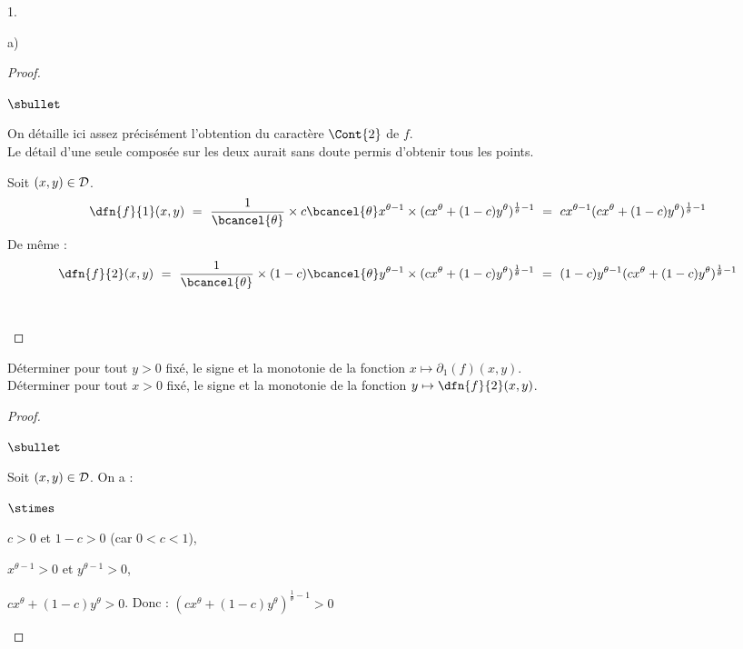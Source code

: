 \begin{noliste}{1.}
\begin{noliste}{a)}
\begin{proof}
\begin{noliste}{$\sbullet$}
    \begin{remark}
     On détaille ici assez précisément l'obtention du 
     caractère $\Cont{2}$ de $f$.\\
     Le détail d'une seule composée sur les deux 
     aurait sans doute permis d'obtenir tous les points.
    \end{remark}
    
    \item Soit $(x,y) \in {\cal D}$.
    \[
     \dfn{f}{1}(x,y) \ = \ \dfrac{1}{\bcancel{\theta}}
     \times c \bcancel{\theta} x^{\theta -1} \times 
     (c x^\theta + (1-c) y^\theta)^{\frac{1}{\theta} -1}
     \ = \ c x^{\theta-1} (c x^\theta + (1-c) 
     y^\theta)^{\frac{1}{\theta} -1}
    \]
    De même :
    \[
     \dfn{f}{2}(x,y) \ = \ \dfrac{1}{\bcancel{\theta}}
     \times (1-c) \bcancel{\theta} y^{\theta -1} \times 
     (c x^\theta + (1-c) y^\theta)^{\frac{1}{\theta} -1}
     \ = \ (1-c) y^{\theta-1} (c x^\theta + (1-c) 
     y^\theta)^{\frac{1}{\theta} -1}
    \]
    ~\\[-1.4cm]
   \end{noliste}
  \end{proof}
  
  
  
  
  \newpage
  
  

  
  \item Déterminer pour tout $y>0$ fixé, le signe et la monotonie de la 
  fonction $x \mapsto \partial_1(f)(x,y).$\\
  Déterminer pour tout $x>0$ fixé, le signe et la monotonie de 
  la fonction $y \mapsto \dfn{f}{2}(x,y)$.
  
  \begin{proof}~
   \begin{noliste}{$\sbullet$}
    \item Soit $(x,y) \in {\cal D}$. On a :
    \begin{noliste}{$\stimes$}
      \item $c>0$ et $1-c>0$ (car $0<c<1$),
      \item $x^{\theta-1}>0$ et $y^{\theta-1}>0$,
      \item $c x^\theta + (1-c) y^\theta >0$. Donc :
      $(c x^\theta + (1-c) y^\theta)^{\frac{1}{\theta}-1}>0$
    \end{noliste}
    

\end{noliste}
\end{proof}
\end{noliste}
\end{noliste}
